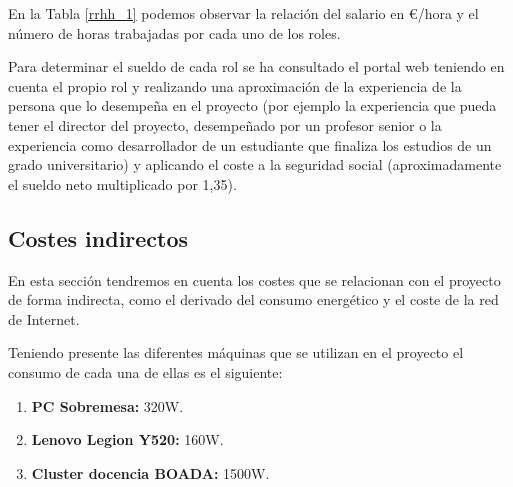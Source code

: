 \documentclass[titlepage,12pt]{report}
\begin{document}
En la Tabla \ref{rrhh_1} podemos observar la relación del salario en €/hora y el número de horas trabajadas por cada uno de los roles. 

Para determinar el sueldo de cada rol se ha consultado el portal web \citep{tuSalario} teniendo en cuenta el propio rol y realizando una aproximación de la experiencia de la persona que lo desempeña en el proyecto (por ejemplo la experiencia que pueda tener el director del proyecto, desempeñado por un profesor senior o la experiencia como desarrollador de un estudiante que finaliza los estudios de un grado universitario) y aplicando el coste a la seguridad social (aproximadamente el sueldo neto multiplicado por 1,35).

\begin{table}[H]
	\centering
	\caption{Coste recursos de RRHH}
	\label{rrhh_1}
\end{table}

\subsection{Costes indirectos}

En esta sección tendremos en cuenta los costes que se relacionan con el proyecto de forma indirecta, como el derivado del consumo energético y el coste de la red de Internet.

Teniendo presente las diferentes máquinas que se utilizan en el proyecto el consumo de cada una de ellas es el siguiente:

\begin{enumerate}
	\item \textbf{PC Sobremesa:} 320W.
	\item \textbf{Lenovo Legion Y520:} 160W.
	\item \textbf{Cluster docencia BOADA:} 1500W.
\end{enumerate}
\end{document}
